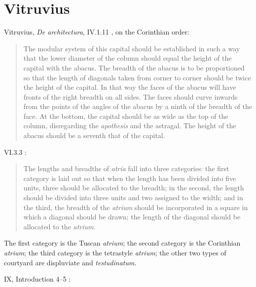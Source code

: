 \documentclass{article}
\theoremstyle{definition}
\begin{document}
\section{Vitruvius}
Vitruvius, {\em De architectura}, IV.1.11 \cite[p.~93]{vitruvius}, on the Corinthian order:

\begin{quote}
The modular system of this capital should be established in such a way that the lower diameter of the column should equal the height of the capital
with the abacus. The breadth of the abacus is to be proportioned so that the length of diagonals taken from corner to corner should be twice the height of the
capital. In that way the faces of the abacus will have fronts of the right breadth on all sides. The faces should curve inwards from the points of the angles of the abacus
by a ninth of the breadth of the face. At the bottom, the capital should be as wide as the top of the column, disregarding the {\em apothesis} and the astragal.
The height of the abacus should be a seventh that of the capital.
\end{quote}

VI.3.3 \cite[p.~172]{vitruvius}:

\begin{quote}
The lengths and breadths of {\em atria} fall into three categories: the first category is laid out so that when the length
has been divided into five units, three should be allocated to the breadth; in the second, the length should be divided
into three units and two assigned to the width; and in the third, the breadth of the {\em atrium} should be incorporated
in a square in which a diagonal should be drawn; the length of the diagonal should be allocated to the
{\em atrium}.
\end{quote}

The first category is the Tuscan {\em atrium}; the second category is the Corinthian {\em atrium}; 
the third category is the tetrastyle {\em atrium}; the other two types of courtyard are displuviate and {\em testudinatum}.

IX, Introduction 4--5 \cite[p.~243]{vitruvius}:
\end{document}
